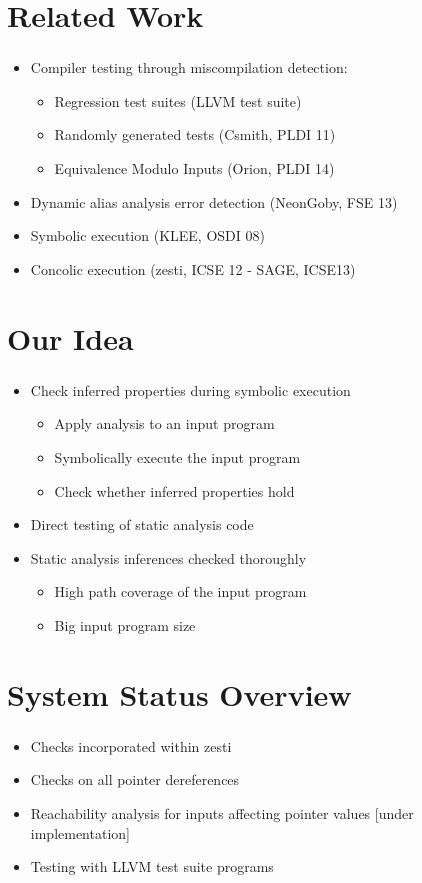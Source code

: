 \documentclass[mathserif,10pt]{beamer}
\begin{document}
\section{Related Work}
\frame
{
  \frametitle{\secname}
  \begin{itemize} [<+->]
    \item Compiler testing through miscompilation detection:
    \begin{itemize}
      \item Regression test suites (LLVM test suite)
      \item Randomly generated tests (Csmith, PLDI 11)
      \item Equivalence Modulo Inputs (Orion, PLDI 14)
    \end{itemize} 
    \item Dynamic alias analysis error detection (NeonGoby, FSE 13)

    \item Symbolic execution (KLEE, OSDI 08) 
    \item Concolic execution (zesti, ICSE 12 - SAGE, ICSE13)
  \end{itemize} 
}

\section{Our Idea}
\frame
{
  \frametitle{\secname}
  \begin{itemize} [<+->]
    \item Check inferred properties during symbolic execution
    \begin{itemize}
      \item Apply analysis to an input program
      \item Symbolically execute the input program
      \item Check whether inferred properties hold
    \end{itemize} 
    \item Direct testing of static analysis code
    \item Static analysis inferences checked thoroughly
    \begin{itemize}
      \item High path coverage of the input program
      \item Big input program size
    \end{itemize} 
  \end{itemize} 
}

\section{System Status Overview}
\frame
{
  \frametitle{\secname}
  \begin{itemize} [<+->]
    \item Checks incorporated within zesti
    \item Checks on all pointer dereferences
    \item Reachability analysis for inputs affecting pointer values [under implementation]
    \item Testing with LLVM test suite programs
  \end{itemize} 
}
\end{document}
